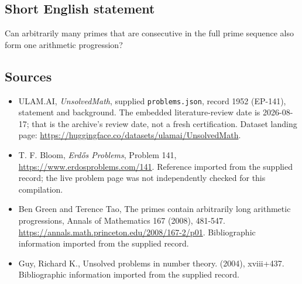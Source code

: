 \documentclass[11pt,a4paper]{article}
\begin{document}
\subsection{Short English statement}

Can arbitrarily many primes that are consecutive in the full prime sequence also form one arithmetic progression?

\subsection{Sources}

{\small

\begin{itemize}

\item[\hypertarget{source:1952:1}{S1}] ULAM.AI, \emph{UnsolvedMath}, supplied \texttt{problems.json}, record 1952 (EP-141), statement and background. The embedded literature-review date is 2026-08-17; that is the archive’s review date, not a fresh certification. Dataset landing page: \url{https://huggingface.co/datasets/ulamai/UnsolvedMath}.

\item[\hypertarget{source:1952:2}{S2}] T. F. Bloom, \emph{Erdős Problems}, Problem 141, \url{https://www.erdosproblems.com/141}. Reference imported from the supplied record; the live problem page was not independently checked for this compilation.

\item[\hypertarget{source:1952:3}{S3}] Ben Green and Terence Tao, The primes contain arbitrarily long arithmetic progressions, Annals of Mathematics 167 (2008), 481-547. \url{https://annals.math.princeton.edu/2008/167-2/p01}. Bibliographic information imported from the supplied record.

\item[\hypertarget{source:1952:4}{S4}] Guy, Richard K., Unsolved problems in number theory. (2004), xviii+437. Bibliographic information imported from the supplied record.

\end{itemize}

}

\label{end:1952}
\end{document}
